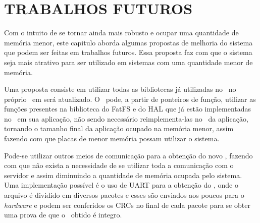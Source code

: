 \section{TRABALHOS FUTUROS}
\label{sec:trabalhosFuturos}

Com o intuito de se tornar ainda mais robusto e ocupar uma quantidade de memória menor, este capitulo aborda algumas propostas de melhoria do sistema que podem ser feitas em trabalhos futuros. Essa proposta faz com que o sistema seja mais atrativo para ser utilizado em sistemas com uma quantidade menor de memória.

Uma proposta consiste em utilizar todas as bibliotecas já utilizadas no \bootloader\ no próprio \firmware\ em será atualizado. O \firmware\ pode, a partir de ponteiros de função, utilizar as funções presentes na biblioteca do FatFS e do HAL que já estão implementadas no \bootloader\ em sua aplicação, não sendo necessário reimplementa-las no \firmware\ da aplicação, tornando o tamanho final da aplicação ocupado na memória menor, assim fazendo com que placas de menor memória possam utilizar o sistema.

Pode-se utilizar outros meios de comunicação para a obtenção do novo \firmware, fazendo com que não exista a necessidade de se utilizar toda a comunicação com o servidor e assim diminuindo a quantidade de memória ocupada pelo sistema. Uma implementação possível é o uso de UART para a obtenção do \firmware, onde o arquivo é dividido em diversos pacotes e esses são enviados aos poucos para o \textit{hardware} e podem ser conferidos os CRCs no final de cada pacote para se obter uma prova de que o \firmware\ obtido é integro.

